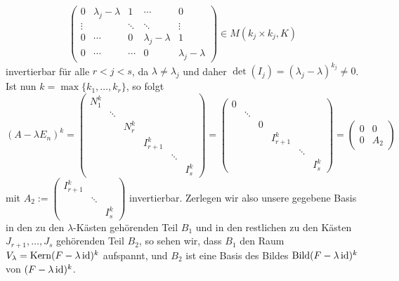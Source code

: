 \begin{bemerkung}
\[\begin{pmatrix}
		0 & \lambda_j - \lambda & 1 & \cdots & 0 \\ 
		\vdots &  & \ddots & \ddots & \vdots \\ 
		0 & \cdots & 0 & \lambda_j - \lambda & 1 \\ 
		0 & \cdots & \cdots & 0 & \lambda_j - \lambda
		\end{pmatrix} \in M(k_j \times k_j,K)
	\]
	invertierbar für alle $r < j < s$, da $\lambda \neq \lambda_j$ und daher $\det(I_j) = (\lambda_j - \lambda)^{k_j} \neq 0$.
	Ist nun $k = \max\{k_1,\dots,k_r\}$, so folgt
	\[
		(A-\lambda E_n)^k = \begin{pmatrix}
		N_1^k &        &               &         &        &  \\
		& \ddots &               &         &        &  \\
		&        & N_r^{k} &         &        &  \\
		&        &               & I_{r+1}^{k} &        &  \\
		&        &               &         & \ddots &  \\
		&        &               &         &        & I_s^{k}
		\end{pmatrix} = \begin{pmatrix}
		0 &        &               &         &        &  \\
		& \ddots &               &         &        &  \\
		&        & 0 &         &        &  \\
		&        &               & I_{r+1}^{k} &        &  \\
		&        &               &         & \ddots &  \\
		&        &               &         &        & I_s^{k}
		\end{pmatrix} = \begin{pmatrix}
			0 & 0 \\ 0 & A_2
		\end{pmatrix}
	\]
	mit $A_2 := \begin{pmatrix}
		I^k_{r+1} & & \\
		 & \ddots & \\
		 & & I_s^{k}
	\end{pmatrix}$ invertierbar.
	Zerlegen wir also unsere gegebene Basis in den zu den $\lambda$-Kästen gehörenden Teil $B_1$ und in den restlichen zu den Kästen $J_{r+1},\dots,J_s$ gehörenden Teil $B_2$, so sehen wir, dass $B_1$ den Raum  $V_\lambda = \operatorname{Kern}(F-\lambda \operatorname{id})^k$ aufspannt, und $B_2$ ist eine Basis des Bildes $\operatorname{Bild}(F-\lambda \operatorname{id})^k$ von $(F-\lambda \operatorname{id})^k$.
\end{bemerkung}

